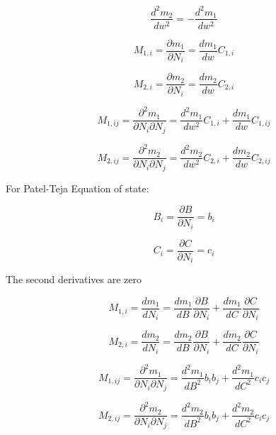 \documentclass[a4paper, 12pt, english, sintefheadings, sintefcolour]{sintefmemo}
\begin{document}
\begin{equation}
\frac{d^2m_2}{dw^2}=-\frac{d^2m_1}{dw^2}
\end{equation}

\begin{equation}
M_{1,i}=\frac{\partial m_1}{\partial N_i}=\frac{d m_1}{dw}C_{1,i}
\end{equation}

\begin{equation}
M_{2,i}=\frac{\partial m_2}{\partial N_i}=\frac{d m_2}{dw}C_{2,i}
\end{equation}

\begin{equation}
M_{1,ij}=\frac{\partial^2 m_1}{\partial N_i \partial N_j}=\frac{d^2 m_1}{dw^2}C_{1,i}+\frac{d m_1}{dw}C_{1,ij}
\end{equation}

\begin{equation}
M_{2,ij}=\frac{\partial^2 m_2}{\partial N_i \partial N_j}=\frac{d^2 m_2}{dw^2}C_{2,i}+\frac{d m_2}{dw}C_{2,ij}
\end{equation}

For Patel-Teja Equation of state:

\begin{equation}
B_{i}=\frac{\partial B}{\partial N_i}=b_i
\end{equation}

\begin{equation}
C_{i}=\frac{\partial C}{\partial N_i}=c_i
\end{equation}

The second derivatives are zero

\begin{equation}
M_{1,i}=\frac{d m_1}{d N_i}=\frac{d m_1}{d B}\frac{\partial B}{\partial N_{i}} +\frac{d m_1}{d C}\frac{\partial C}{\partial N_{i}} 
\end{equation}

\begin{equation}
M_{2,i}=\frac{d m_2}{d N_i}=\frac{d m_2}{d B}\frac{\partial B}{\partial N_{i}} +\frac{d m_2}{d C}\frac{\partial C}{\partial N_{i}} 
\end{equation}

\begin{equation}
M_{1,ij}=\frac{\partial^2 m_1}{\partial N_i \partial N_j}=\frac{d^2 m_1}{dB^2} b_i b_j +\frac{d^2 m_1}{d C^2} c_i c_j
\end{equation}

\begin{equation}
M_{2,ij}=\frac{\partial^2 m_2}{\partial N_i \partial N_j}=\frac{d^2 m_2}{dB^2} b_i b_j +\frac{d^2 m_2}{d C^2} c_i c_j
\end{equation}
\end{document}
